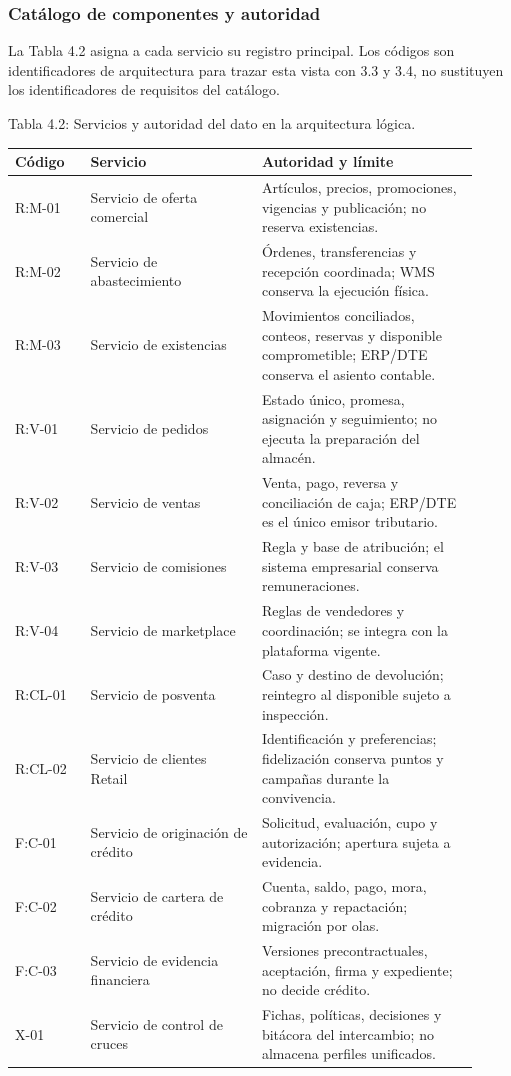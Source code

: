 \documentclass[11pt]{article}
\begin{document}
\subsubsection{Catálogo de componentes y autoridad}

La Tabla 4.2 asigna a cada servicio su registro principal. Los códigos son identificadores de arquitectura para trazar esta vista con 3.3 y 3.4, no sustituyen los identificadores de requisitos del catálogo.

\par\vspace{0pt plus 10\baselineskip}\vspace{0pt plus -10\baselineskip}

Tabla 4.2: Servicios y autoridad del dato en la arquitectura lógica.\par\nopagebreak
\begin{longtable}{@{}p{0.15\linewidth}p{0.34\linewidth}p{0.43\linewidth}@{}}
\toprule Código & Servicio & Autoridad y límite \\
\midrule\endhead\bottomrule\endlastfoot
R:M-01 & Servicio de oferta comercial & Artículos, precios, promociones, vigencias y publicación; no reserva existencias. \\
R:M-02 & Servicio de abastecimiento & Órdenes, transferencias y recepción coordinada; WMS conserva la ejecución física. \\
R:M-03 & Servicio de existencias & Movimientos conciliados, conteos, reservas y disponible comprometible; ERP/DTE conserva el asiento contable. \\
R:V-01 & Servicio de pedidos & Estado único, promesa, asignación y seguimiento; no ejecuta la preparación del almacén. \\
R:V-02 & Servicio de ventas & Venta, pago, reversa y conciliación de caja; ERP/DTE es el único emisor tributario. \\
R:V-03 & Servicio de comisiones & Regla y base de atribución; el sistema empresarial conserva remuneraciones. \\
R:V-04 & Servicio de marketplace & Reglas de vendedores y coordinación; se integra con la plataforma vigente. \\
R:CL-01 & Servicio de posventa & Caso y destino de devolución; reintegro al disponible sujeto a inspección. \\
R:CL-02 & Servicio de clientes Retail & Identificación y preferencias; fidelización conserva puntos y campañas durante la convivencia. \\
F:C-01 & Servicio de originación de crédito & Solicitud, evaluación, cupo y autorización; apertura sujeta a evidencia. \\
F:C-02 & Servicio de cartera de crédito & Cuenta, saldo, pago, mora, cobranza y repactación; migración por olas. \\
F:C-03 & Servicio de evidencia financiera & Versiones precontractuales, aceptación, firma y expediente; no decide crédito. \\
X-01 & Servicio de control de cruces & Fichas, políticas, decisiones y bitácora del intercambio; no almacena perfiles unificados. \\
\end{longtable}
\end{document}
